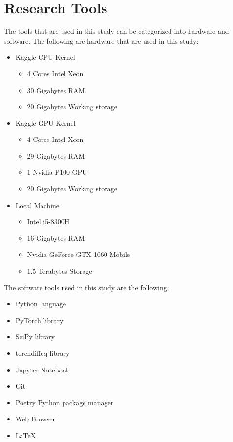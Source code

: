 \section{Research Tools}
\noindent The tools that are used in this study can be categorized into hardware and software. The following are hardware that are used in this study:
\begin{itemize}
      \item Kaggle CPU Kernel~\autocite{GettingStartedKaggle}
            \begin{itemize}
                  \item 4 Cores Intel Xeon
                  \item 30 Gigabytes RAM
                  \item 20 Gigabytes Working storage
            \end{itemize}
      \item Kaggle GPU Kernel~\autocite{GettingStartedKaggle}
            \begin{itemize}
                  \item 4 Cores Intel Xeon
                  \item 29 Gigabytes RAM
                  \item 1 Nvidia P100 GPU
                  \item 20 Gigabytes Working storage
            \end{itemize}
      \item Local Machine
            \begin{itemize}
                  \item Intel i5{-}8300H
                  \item 16 Gigabytes RAM
                  \item Nvidia GeForce GTX 1060 Mobile
                  \item 1.5 Terabytes Storage
            \end{itemize}
\end{itemize}
The software tools used in this study are the following:
\begin{itemize}
      \item Python language
      \item PyTorch library
      \item SciPy library
      \item torchdiffeq library
      \item Jupyter Notebook
      \item Git
      \item Poetry Python package manager
      \item Web Browser
      \item \LaTeX{}
\end{itemize}
